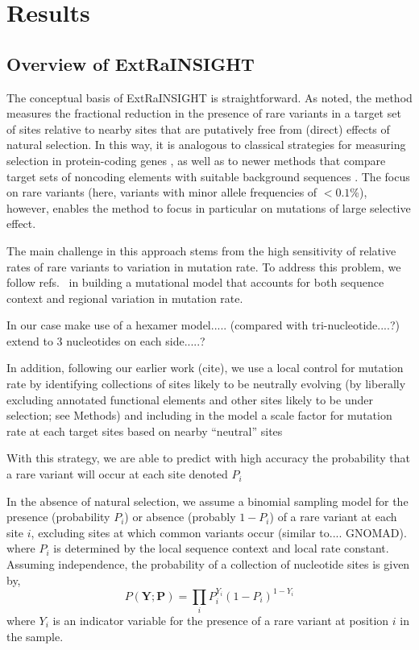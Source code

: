 \documentclass[11pt]{article}
\newcommand{\mathbb}[1]{\boldsymbol{\mathbf{#1}}}
\begin{document}
\section*{Results}

\subsection*{Overview of ExtRaINSIGHT}

The conceptual basis of ExtRaINSIGHT is straightforward.  As noted, the method measures the fractional reduction in the presence of rare variants in a target set of sites relative to nearby sites that are putatively free from (direct) effects of natural selection.  In this way, it is analogous to classical strategies for measuring selection in protein-coding genes \cite{LIETAL81,KIMU83,KONDCROW93}, as well as to newer methods that compare target sets of noncoding elements with suitable background sequences \cite{SIEPETAL05,COOPETAL05,GAFFETAL08,ARBIETAL13}.  The focus on rare variants (here, variants with minor allele frequencies of $< 0.1$\%), however, enables the method to focus in particular on mutations of large selective effect.

The main challenge in this approach stems from the high sensitivity of relative rates of rare variants to variation in mutation rate.  To address this problem, we follow refs.\ \cite{SAMOETAL20,LEKETAL16} in building a mutational model that accounts for both sequence context and regional variation in mutation rate.

In our case
make use of a 
hexamer model.....
(compared with tri-nucleotide....?)
extend to 3 nucleotides on each side.....?

In addition, following our earlier work (cite), we use a local control for mutation rate
by identifying collections of sites likely to be neutrally evolving (by liberally excluding annotated functional elements and other sites likely to be under selection; see Methods)
and including in the model a scale factor for mutation rate at each target sites based on nearby ``neutral'' sites

With this strategy,
we are able to predict with high accuracy the probability that a rare variant will occur at each site
denoted $P_i$


In the absence of natural selection, we assume a  binomial sampling model for the presence (probability $P_i$) or absence (probably $1-P_i$) of a rare variant at each site $i$, excluding sites at which common variants occur (similar to.... GNOMAD).
where $P_i$ is determined by the local sequence context and local rate constant.  Assuming independence, the probability of a collection of nucleotide sites is given by,
\begin{equation}
P(\mathbb{Y}; \mathbb{P}) = \prod_i P_i^{Y_i}(1-P_i)^{1-Y_i}
\end{equation}
\noindent where $Y_i$ is an indicator variable for the presence of a rare variant at position $i$ in the sample.
\end{document}
